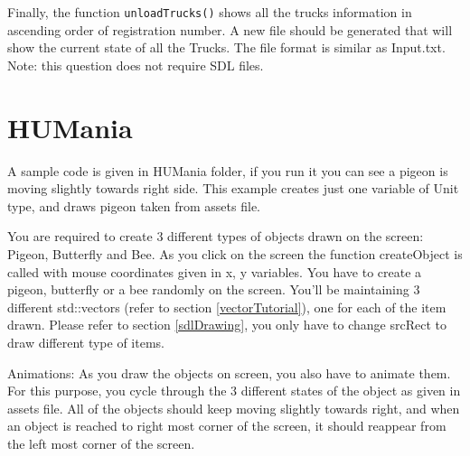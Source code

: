 \documentclass[a4paper,12pt]{article}
\begin{document}
	\noindent Finally, the function \texttt{unloadTrucks()} shows all the trucks information in ascending order of registration number. A new file  should be generated that will show the current state of all the Trucks. The file format is similar as Input.txt.\smallskip\\	

	Note: this question does not require SDL files.
	
	\section{HUMania}
	
A sample code is given in HUMania folder, if you run it you can see a pigeon is moving slightly towards right side. This example creates just one variable of  Unit type, and draws pigeon taken from assets file. 
	
You are required to create 3 different types of objects drawn on the screen: Pigeon, Butterfly and Bee. As you click on the screen the function createObject is called with mouse coordinates given in x, y variables. You have to create a pigeon, butterfly or a bee randomly on the screen. You'll be maintaining 3 different std::vectors (refer to section \ref{vectorTutorial}), one for each of the item drawn. Please refer to section \ref{sdlDrawing}, you only have to change srcRect to draw different type of items. 

Animations: As you draw the objects on screen, you also have to animate them. For this purpose, you cycle through the 3 different states of the object as given in assets file. 
All of the objects should keep moving slightly towards right, and when an object is reached to right most corner of the screen, it should reappear from the left most corner of the screen. 

%	 	
%	 	
 
\end{document}
